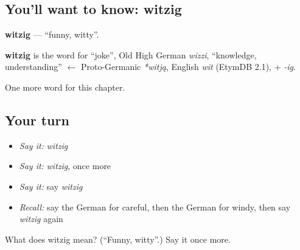 \subsection*{You'll want to know: witzig}
\textbf{witzig} — \textquotedblleft{}funny, witty\textquotedblright{}.

\begin{cousinweb}
\textbf{witzig} is the word for \textquotedblleft{}joke\textquotedblright{}, Old High German \emph{wizzi}, \textquotedblleft{}knowledge, understanding\textquotedblright{} $\leftarrow$ Proto-Germanic \emph{*witją}, English \emph{wit} (EtymDB 2.1), + \emph{-ig}.
\end{cousinweb}

\begin{grammarlens}[title={What you've built}]
One more word for this chapter.
\end{grammarlens}

\subsection*{Your turn}
\begin{itemize}
\raggedright
  \item \emph{Say it:} \emph{witzig}
  \item \emph{Say it:} \emph{witzig}, once more
  \item \emph{Say it:} say \emph{witzig}
  \item \emph{Recall:} say the German for careful, then the German for windy, then say \emph{witzig} again
\end{itemize}

\begin{tcolorbox}[breakable,colback=teal!4,colframe=teal!35!black,title={Before you move on}]
What does witzig mean? (\textquotedblleft{}Funny, witty\textquotedblright{}.) Say it once more.
\end{tcolorbox}
